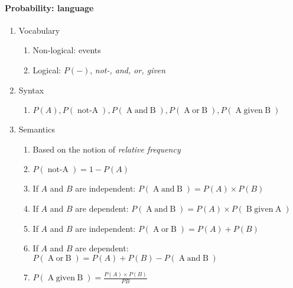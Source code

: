 \documentclass[10pt,landscape]{article}
\newcommand\negate[1]{\mathop{\mbox{$not$-$#1$}}}
\newcommand\disjoin[2]{\mathop{\mbox{$#1\; or\; #2$}}}
\newcommand\conjoin[2]{\mathop{\mbox{$#1\; and\; #2$}}}
\newcommand\given[2]{\mathop{\mbox{$#1\; given\; #2$}}}
\begin{document}
\begin{multicols}{2}
\begin{enumerate}
\paragraph{Probability: language}
    \begin{enumerate}
   \item Vocabulary
    \begin{enumerate}
     \item Non-logical: events
     \item Logical: $P(-)$, \textit{not-, and, or, given}
    \end{enumerate}
   \item Syntax
    \begin{enumerate}
     \item $P(A), P(\negate{A}), P(\conjoin{A}{B}), P(\disjoin{A}{B}), P(\given{A}{B})$
    \end{enumerate}
   \item Semantics
    \begin{enumerate}
     \item Based on the notion of \textit{relative frequency}
     \item $P(\negate{A}) = 1 - P(A)$
     \item If $A$ and $B$ are independent: $P(\conjoin{A}{B}) = P(A)\times P(B)$
     \item If $A$ and $B$ are dependent: $P(\conjoin{A}{B}) = P(A)\times P(\given{B}{A})$
     \item If $A$ and $B$ are independent: $P(\disjoin{A}{B}) = P(A)+ P(B)$
     \item If $A$ and $B$ are dependent: $P(\disjoin{A}{B}) = P(A)+ P(B) - P(\conjoin{A}{B})$
     \item $P(\given{A}{B}) = \frac{P(A)\times P(B)}{P{B}}$
    \end{enumerate}


\end{enumerate}
\end{enumerate}
\end{multicols}
\end{document}
